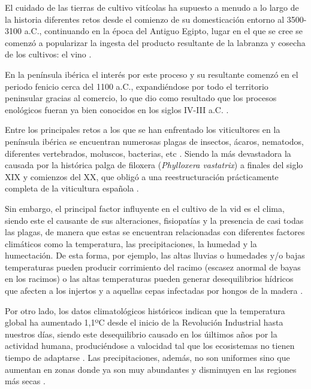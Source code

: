 El cuidado de las tierras de cultivo vitícolas ha supuesto a menudo a lo largo 
de la historia diferentes retos desde el comienzo de su domesticación entorno al 
3500-3100 a.C., continuando en la época del Antiguo Egipto, lugar en el que se cree se comenzó a popularizar la ingesta
del producto resultante de la labranza y cosecha de los cultivos: el vino \cite{book:piqueras2014}.

En la península ibérica el interés por este proceso y su resultante comenzó en el 
periodo fenicio cerca del 1100 a.C., expandiéndose por todo el territorio peninsular
gracias al comercio, lo que dio como resultado que los procesos enológicos fueran ya bien
conocidos en los siglos IV-III a.C. \cite{book:piqueras2014, MAPA:Historia}.

Entre los principales retos a los que se han enfrentado los viticultores en la península ibérica se 
encuentran numerosas plagas de insectos, ácaros, nematodos, diferentes vertebrados, moluscos, bacterias, etc \cite{book:mundi2004cap1}.
Siendo la más devastadora la causada por la histórica palga de filoxera (\textit{Phylloxera vastatrix}) a 
finales del siglo XIX y comienzos del XX, que obligó a una reestructuración prácticamente completa de la viticultura española \cite{book:mundi2004cap3}.

Sin embargo, el principal factor influyente en el cultivo de la vid es el clima, siendo este el causante de sus alteraciones, fisiopatías y
la presencia de casi todas las plagas, de manera que estas se encuentran relacionadas con diferentes 
factores climáticos como la temperatura, las precipitaciones, la humedad y la humectación. 
De esta forma, por ejemplo, las altas lluvias o humedades y/o bajas temperaturas pueden producir corrimiento del racimo (escasez anormal de bayas en los racimos) o 
las altas temperaturas pueden generar desequilibrios hídricos que afecten a los injertos y a aquellas cepas infectadas por hongos de la madera \cite{book:mundi2004cap1}.

\clearpage

Por otro lado, los datos climatológicos históricos indican que la temperatura global ha aumentado 1,1ºC desde el 
inicio de la Revolución Industrial hasta nuestros días, siendo este desequilibrio causado en los úiltimos años
por la actividad humana, produciéndose a valocidad tal que los ecosistemas no tienen tiempo de adaptarse \cite{book:zuniga2021}.
Las precipitaciones, además, no son uniformes sino que aumentan en zonas donde ya son muy abundantes y disminuyen
en las regiones más secas \cite{book:zuniga2021}.

